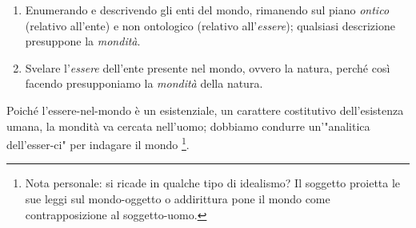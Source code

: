 \documentclass[a4paper,12pt,oneside]{article}%
\begin{document}
\begin{enumerate}
	\item Enumerando e descrivendo gli enti del mondo, rimanendo sul piano \textit{ontico} (relativo all'ente) e non ontologico (relativo all'\textit{essere}); qualsiasi descrizione presuppone la \textit{mondità}.
	\item Svelare l'\textit{essere} dell'ente presente nel mondo, ovvero la natura, perché così facendo presupponiamo la \textit{mondità} della natura.
\end{enumerate}

Poiché l'essere-nel-mondo è un esistenziale, un carattere costitutivo dell'esistenza umana, la mondità va cercata nell'uomo; dobbiamo condurre un'"analitica dell'esser-ci" per indagare il mondo \footnote{Nota personale: si ricade in qualche tipo di idealismo? Il soggetto proietta le sue leggi sul mondo-oggetto o addirittura pone il mondo come contrapposizione al soggetto-uomo.}.
	
	
\end{document}
